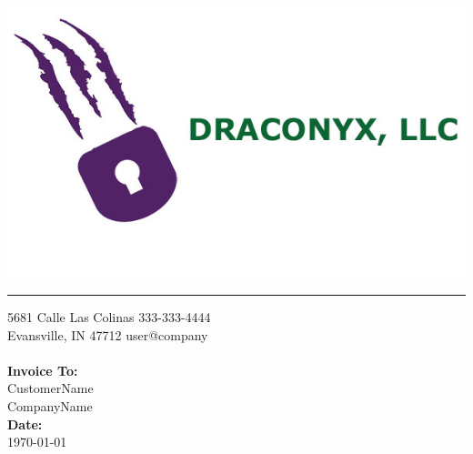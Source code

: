 \documentclass{invoice} %
\def \tab {\hspace*{3ex}} %
\begin{document}

\hfil{\includegraphics[scale=0.2]{draconyx-splash.jpg}}\hfil
\hrule %

5681 Calle Las Colinas \hfill 333-333-4444 \\ %
Evansville, IN 47712  \hfill user@company
\\ \\
{\bf Invoice To:} \\
\tab CustomerName\\ %
\tab CompanyName \\ %
{\bf Date:} \\
\tab \today \\ %


\begin{invoiceTable}



\end{invoiceTable}

\end{document}
